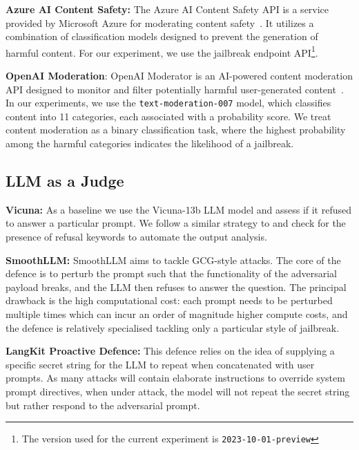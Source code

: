 \noindent\textbf{Azure AI Content Safety:} The Azure AI Content Safety API is a service provided by Microsoft Azure for moderating content safety~\cite{azureaicontentsafety}. It utilizes a combination of classification models designed to prevent the generation of harmful content. 
For our experiment, we use the jailbreak endpoint API\footnote{The version used for the current experiment is {\tt 2023-10-01-preview}}. 


\noindent\textbf{OpenAI Moderation}:
OpenAI Moderator \cite{protectai_link} is an AI-powered content moderation API designed to monitor and filter potentially harmful user-generated content~\cite{openaimoderation}. 
In our experiments, we use the {\tt text-moderation-007} model, which classifies content into 11 categories, each associated with a probability score. We treat content moderation as a binary classification task, where the highest probability among the harmful categories indicates the likelihood of a jailbreak.

\subsection{LLM as a Judge}

\noindent\textbf{Vicuna:} As a baseline we use the Vicuna-13b LLM model and assess if it refused to answer a particular prompt. We follow a similar strategy to \cite{zou2023universal,robey2023smoothllm} and check for the presence of refusal keywords to automate the output analysis.

\noindent\textbf{SmoothLLM:} SmoothLLM \cite{robey2023smoothllm} aims to tackle GCG-style attacks. The core of the defence is to perturb the prompt such that the functionality of the adversarial payload breaks, and the LLM then refuses to answer the question. The principal drawback is the high computational cost: each prompt needs to be perturbed multiple times which can incur an order of magnitude higher compute costs, and the defence is relatively specialised tackling only a particular style of jailbreak.

\noindent\textbf{LangKit Proactive Defence:} This defence \cite{LangKit,liu2023prompt} relies on the idea of supplying a specific secret string for the LLM to repeat when concatenated with user prompts. As many attacks will contain elaborate instructions to override system prompt directives, when under attack, the model will not repeat the secret string but rather respond to the adversarial prompt. 

